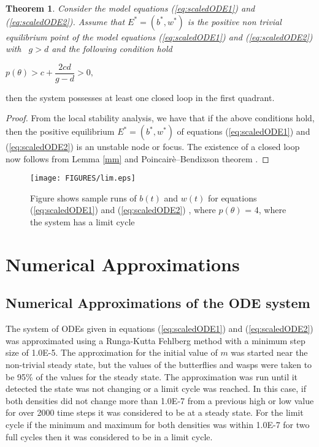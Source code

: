 \documentclass[review,authoryear]{elsarticle}
\newtheorem{theorem}{Theorem}[section]
\begin{document}
\begin{theorem}
   Consider the model equations (\ref{eq:scaledODE1}) and
  (\ref{eq:scaledODE2}). Assume that $E^{\ast }=(b^{\ast },w^{\ast })$
  is the positive non trivial equilibrium point of the model equations
  (\ref{eq:scaledODE1}) and (\ref{eq:scaledODE2}) with \ $g>d$ and the
  following condition hold
\end{theorem}

\begin{center}
$%
p(\theta )>c+\dfrac{2cd}{g-d}>0,$
\end{center}

then the system possesses at least one closed loop in the first quadrant.

\begin{proof}
  From the local stability analysis, we have that if the above
  conditions hold, then the positive equilibrium
  $E^{\ast }=(b^{\ast },w^{\ast })$ of equations (\ref{eq:scaledODE1})
  and (\ref{eq:scaledODE2}) is an unstable node or focus. The
  existence of a closed loop now follows from Lemma \ref{mm} and
  Poincair{\`e}--Bendixson theorem \citep{nonlinearChaos}.
\end{proof}

\begin{figure}[!htp]
\begin{center}
\texttt{[image: FIGURES/lim.eps]}  

\end{center}

\caption{Figure shows sample runs of $b(t)$ and $w(t)$ for equations
  (\ref{eq:scaledODE1}) and (\ref{eq:scaledODE2}) , where
  $p(\theta )$ = 4, where the system has a limit cycle }
      \label{fig:lim}
\end{figure}

\fi

\section{Numerical Approximations}
\label{numericalApproximationODE}
\subsection{Numerical Approximations of the ODE system}
The system of ODEs given in
equations (\ref{eq:scaledODE1}) and (\ref{eq:scaledODE2}) was
approximated using a Runga-Kutta Fehlberg method with a minimum step
size of 1.0E-5. 
The approximation for the initial value of $m$ was started near the
non-trivial steady state, but the values of the butterflies and wasps
were taken to be 95\% of the values for the steady state. The
approximation was run until it detected the state was not changing or
a limit cycle was reached. In this case, if both densities did not
change more than 1.0E-7 from a previous high or low value for over
2000 time steps it was considered to be at a steady state. For the
limit cycle if the minimum and maximum for both densities was within
1.0E-7 for two full cycles then it was considered to be in a limit
cycle.
\end{document}

